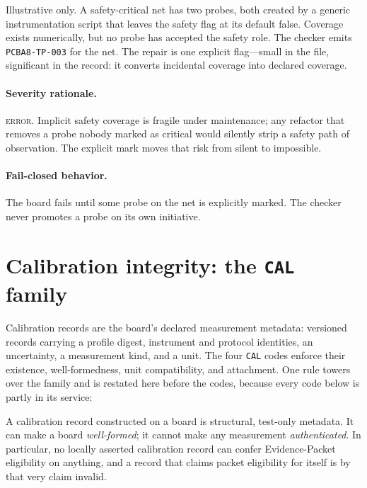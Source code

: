 \begin{example}\label{ch07:ex:tp003}
Illustrative only. A safety-critical net has two probes, both created by a generic instrumentation script that leaves the safety flag at its default false. Coverage exists numerically, but no probe has accepted the safety role. The checker emits \texttt{PCBA8-TP-003} for the net. The repair is one explicit flag---small in the file, significant in the record: it converts incidental coverage into declared coverage.
\end{example}

\paragraph{Severity rationale.} \textsc{error}. Implicit safety coverage is fragile under maintenance; any refactor that removes a probe nobody marked as critical would silently strip a safety path of observation. The explicit mark moves that risk from silent to impossible.

\paragraph{Fail-closed behavior.} The board fails until some probe on the net is explicitly marked. The checker never promotes a probe on its own initiative.

\section{Calibration integrity: the \texttt{CAL} family}\label{ch07:sec:cal}

Calibration records are the board's declared measurement metadata: versioned records carrying a profile digest, instrument and protocol identities, an uncertainty, a measurement kind, and a unit. The four \texttt{CAL} codes enforce their existence, well-formedness, unit compatibility, and attachment. One rule towers over the family and is restated here before the codes, because every code below is partly in its service:

\begin{ruleenv}\label{ch07:rule:cal}
A calibration record constructed on a board is structural, test-only metadata. It can make a board \emph{well-formed}; it cannot make any measurement \emph{authenticated}. In particular, no locally asserted calibration record can confer Evidence-Packet eligibility on anything, and a record that claims packet eligibility for itself is by that very claim invalid.
\end{ruleenv}

